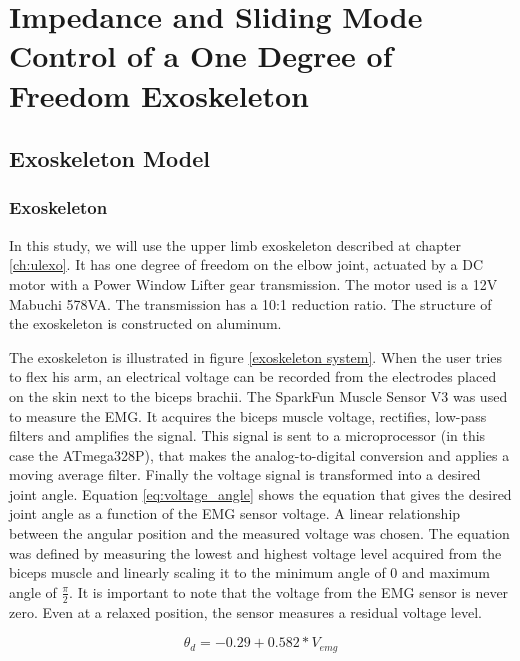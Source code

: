 \chapter{Impedance and Sliding Mode Control of a One Degree of Freedom Exoskeleton}

\section{Exoskeleton Model}

\subsection{Exoskeleton}

In this study, we will use the upper limb exoskeleton described at chapter \ref{ch:ulexo}. It has one degree of freedom on the elbow joint, actuated by a DC motor with a Power Window Lifter gear transmission. The motor used is a 12V Mabuchi 578VA. The transmission has a 10:1 reduction ratio. The structure of the exoskeleton is constructed on aluminum. 

The exoskeleton is illustrated in figure \ref{exoskeleton system}. When the user tries to flex his arm, an electrical voltage can be recorded from the electrodes placed on the skin next to the biceps brachii. The SparkFun Muscle Sensor V3 was used to measure the EMG. It acquires the biceps muscle voltage, rectifies, low-pass filters  and amplifies the signal. This signal is sent to a microprocessor (in this case the ATmega328P), that makes the analog-to-digital conversion and applies a moving average filter. Finally the voltage signal is transformed into a desired joint angle. Equation \ref{eq:voltage_angle} shows the equation that gives the desired joint angle as a function of the EMG sensor voltage. A linear relationship between the angular position and the measured voltage was chosen. The equation was defined by measuring the lowest and highest voltage level acquired from the biceps muscle and linearly scaling it to the minimum angle of 0 and maximum angle of \(\frac{\pi}{2}\). It is important to note that the voltage from the EMG sensor is never zero. Even at a relaxed position, the sensor measures a residual voltage level.

\begin{equation}
\label{eq:voltage_angle}
\theta_d = -0.29 + 0.582 * V_{emg}
\end{equation}

